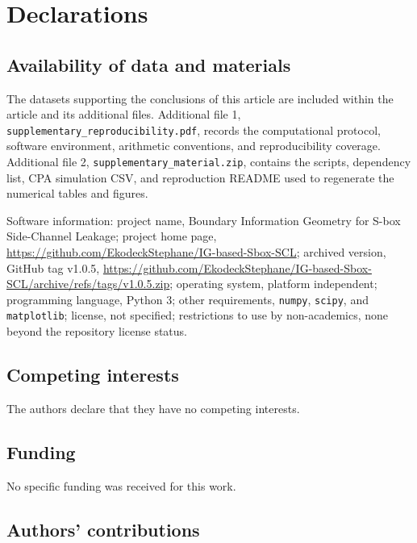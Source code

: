 \section*{Declarations}

\subsection*{Availability of data and materials}

The datasets supporting the conclusions of this article are included within the
article and its additional files.  Additional file 1,
\texttt{supplementary\_reproducibility.pdf}, records the computational
protocol, software environment, arithmetic conventions, and reproducibility
coverage.  Additional file 2, \texttt{supplementary\_material.zip}, contains
the scripts, dependency list, CPA simulation CSV, and reproduction README used
to regenerate the numerical tables and figures.

Software information: project name, Boundary Information Geometry for S-box
Side-Channel Leakage; project home page,
\url{https://github.com/EkodeckStephane/IG-based-Sbox-SCL}; archived version,
GitHub tag v1.0.5,
\url{https://github.com/EkodeckStephane/IG-based-Sbox-SCL/archive/refs/tags/v1.0.5.zip};
operating system, platform independent; programming language, Python 3; other requirements,
\texttt{numpy}, \texttt{scipy}, and \texttt{matplotlib}; license, not
specified; restrictions to use by non-academics, none beyond the repository
license status.

\subsection*{Competing interests}

The authors declare that they have no competing interests.

\subsection*{Funding}

No specific funding was received for this work.

\subsection*{Authors' contributions}

